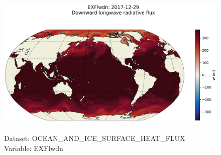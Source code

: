 \begin{figure}[H]
\centering
\includegraphics[scale=0.5]{../images/plots/latlon_plots/Ocean_and_Sea-Ice_Surface_Heat_Fluxes/EXFlwdn.png}
\caption{\\Dataset: OCEAN\_AND\_ICE\_SURFACE\_HEAT\_FLUX\\Variable: EXFlwdn}
\label{tab:table-OCEAN_AND_ICE_SURFACE_HEAT_FLUX_EXFlwdn-Plot}
\end{figure}
\pagebreak

